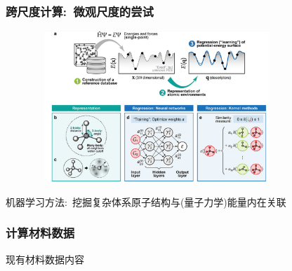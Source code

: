 {
	\frametitle{跨尺度计算:~微观尺度的尝试}
\begin{figure}[h!]
\vspace*{-0.15in}
\centering
\includegraphics[height=2.25in,width=3.65in,viewport=0 0 1215 822,clip]{Figures/Schematic-illustration-machine_learning_algorithm-to-find-the-relationship-of-the-atomic_configuration-and-energy.png}
\label{Schematic-illustration-machine_learning_algorithm-to-find-the-relationship-of-the-atomic_configuration-and-energy}
\end{figure}
机器学习方法:~挖掘复杂体系原子结构与(量子力学)能量内在关联
}

%
\frame
{
	\frametitle{计算材料数据}
	现有材料数据内容\\
}

